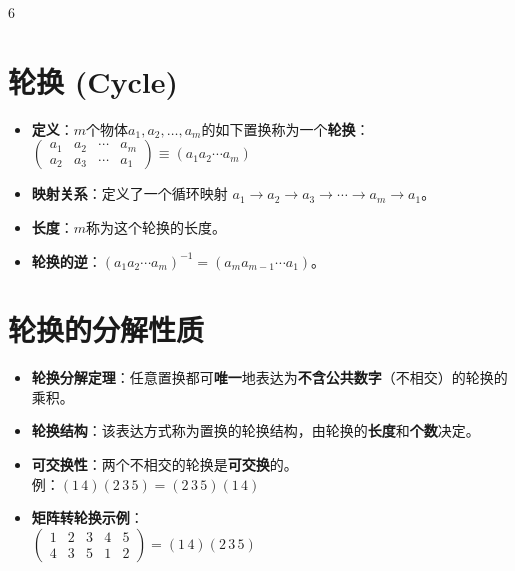 \documentclass[landscape]{article}
\begin{document}
\begin{multicols*}{6}
\section*{轮换 (Cycle)}
\begin{itemize}
  \item \textbf{定义}：$m$个物体$a_1, a_2, \dots, a_m$的如下置换称为一个\textbf{轮换}：
  \\
  $
  \begin{pmatrix} a_1 & a_2 & \cdots & a_m \\ a_2 & a_3 & \cdots & a_1 \end{pmatrix} \equiv (a_1 a_2 \cdots a_m)
  $
  \item \textbf{映射关系}：定义了一个循环映射 $a_1 \to a_2 \to a_3 \to \cdots \to a_m \to a_1$。
  \item \textbf{长度}：$m$称为这个轮换的长度。
  \item \textbf{轮换的逆}：$(a_1 a_2 \cdots a_m)^{-1} = (a_m a_{m-1} \cdots a_1)$。
\end{itemize}

\section*{轮换的分解性质}
\begin{itemize}
  \item \textbf{轮换分解定理}：{\color{red}任意置换都可\textbf{唯一}地表达为\textbf{不含公共数字}（不相交）的轮换的乘积。}
  \item \textbf{轮换结构}：该表达方式称为置换的轮换结构，由轮换的\textbf{长度}和\textbf{个数}决定。
  \item \textbf{可交换性}：两个不相交的轮换是\textbf{可交换}的。
  \\ $ \text{例：} (1\,4)(2\,3\,5) = (2\,3\,5)(1\,4) $
  \item \textbf{矩阵转轮换示例}：
  \\
  $
  \begin{pmatrix} 1 & 2 & 3 & 4 & 5 \\ 4 & 3 & 5 & 1 & 2 \end{pmatrix} = (1\,4)(2\,3\,5)
  $
\end{itemize}


\end{multicols*}
\end{document}
